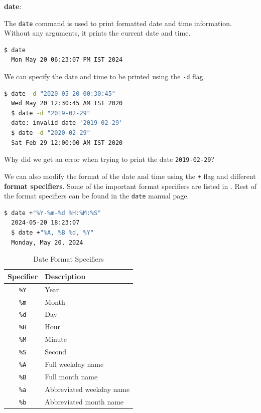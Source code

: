 \textbf{date}:

The \texttt{date} command is used to print formatted date and time information.
Without any arguments, it prints the current date and time.

\begin{lstlisting}[language=bash]
  $ date
  Mon May 20 06:23:07 PM IST 2024
\end{lstlisting}

We can specify the date and time to be printed using the \texttt{-d} flag.

\begin{lstlisting}[language=bash]
  $ date -d "2020-05-20 00:30:45"
  Wed May 20 12:30:45 AM IST 2020
  $ date -d "2019-02-29"
  date: invalid date '2019-02-29'
  $ date -d "2020-02-29"
  Sat Feb 29 12:00:00 AM IST 2020
\end{lstlisting}

\begin{exercise}
  Why did we get an error when trying to print the date \texttt{2019-02-29}?
\end{exercise}

We can also modify the format of the date and time using the \texttt{+} flag and different \textbf{format specifiers}.
Some of the important format specifiers are listed in .
Rest of the format specifiers can be found in the \texttt{date} manual page.

\begin{lstlisting}[language=bash]
  $ date +"%Y-%m-%d %H:%M:%S"
  2024-05-20 18:23:07
  $ date +"%A, %B %d, %Y"
  Monday, May 20, 2024
\end{lstlisting}

\begin{table}[h]
\caption{Date Format Specifiers}
\begin{tabular}{ c l }
  \toprule
 Specifier & Description \\
 \midrule
  \texttt{\%Y} & Year \\
  \texttt{\%m} & Month \\
  \texttt{\%d} & Day \\
  \texttt{\%H} & Hour \\
  \texttt{\%M} & Minute \\
  \texttt{\%S} & Second \\
  \texttt{\%A} & Full weekday name \\
  \texttt{\%B} & Full month name \\
  \texttt{\%a} & Abbreviated weekday name \\
  \texttt{\%b} & Abbreviated month name \\
  \bottomrule
\end{tabular}
\end{table}

